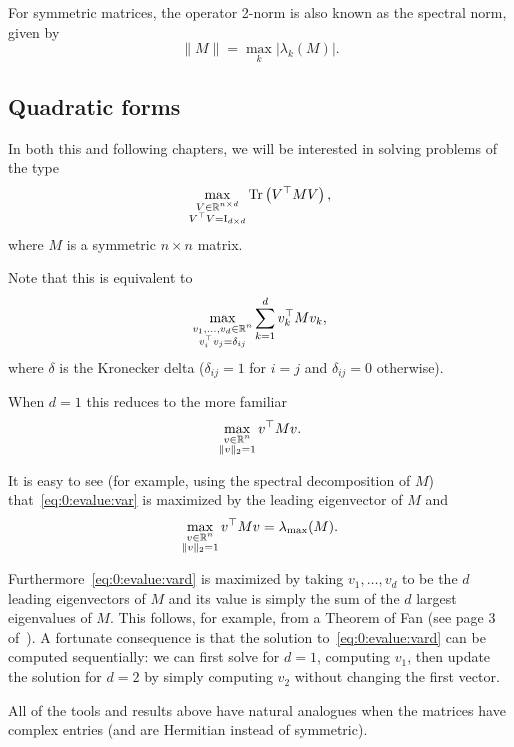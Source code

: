 For symmetric matrices, the operator 2-norm is also known as the spectral norm, given by
\[
 \|M\| = \max_k \left|\lambda_k(M)\right|.
\]



\subsection{Quadratic forms}

In both this and following chapters, we will be interested in solving problems of the type
\[
 \max_{\substack{V\in \mathbb{R}^{n\times d} \\ V^\top  V = \operatorname{I}_{d\times d}}} \operatorname{Tr}\left(V^\top   M V \right),
\]
where $M$ is a symmetric $n\times n$ matrix.

Note that this is equivalent to
\begin{equation}\label{eq:0:evalue:vard}
 \max_{\substack{v_1,\dots,v_d \in \mathbb{R}^{n} \\ v_i^\top  v_j = \delta_{ij}}} \sum_{k=1}^d v_k^\top   M v_k,
\end{equation}
where $\delta$ is the Kronecker delta ($\delta_{ij}=1$ for $i=j$ and $\delta_{ij}=0$ otherwise).

When $d=1$ this reduces to the more familiar
\begin{equation}\label{eq:0:evalue:var}
 \max_{\substack{v\in \mathbb{R}^n \\ \|v\|_2 = 1}} v^\top   M v.
\end{equation}

It is easy to see (for example, using the spectral decomposition of $M$) that~\eqref{eq:0:evalue:var} is maximized by the leading eigenvector of $M$ and
\[
\max_{\substack{v\in \mathbb{R}^n \\ \|v\|_2 = 1}} v^\top   M v = \lambda_{\max} (M).
\]

Furthermore~\eqref{eq:0:evalue:vard} is maximized by
taking $v_1,\dots,v_d$ to be the $d$ leading eigenvectors of $M$ and its value is simply the sum of the $d$ largest eigenvalues of $M$. This follows, for example, from a Theorem of Fan (see page 3 of~\cite{Fan_variational_evalue_UAU}).  A fortunate consequence is that the solution to~\eqref{eq:0:evalue:vard} can be computed sequentially: we can first solve for $d=1$, computing $v_1$, then update the solution for $d=2$ by simply computing $v_2$ without changing the first vector.

\begin{remark}
All of the tools and results above have natural analogues when the matrices have complex entries (and are Hermitian instead of symmetric).
\end{remark}

